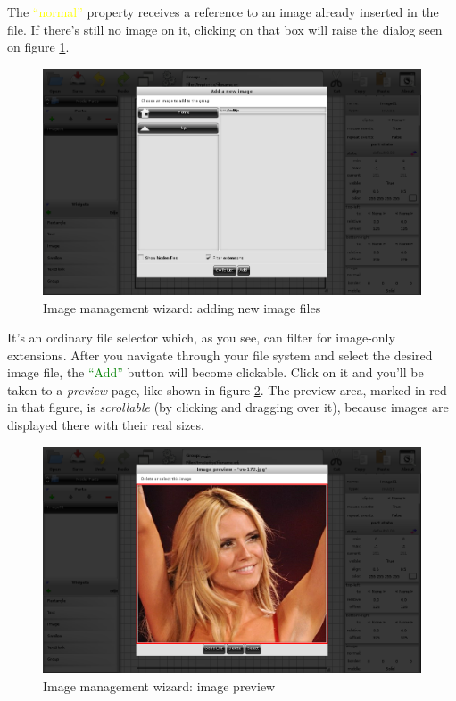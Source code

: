\documentclass[a4paper]{profusion}
\newcommand{\GUIButton}[1]{\textcolor{green}{#1}} %
\newcommand{\GUIEditable}[1]{\textcolor{yellow}{#1}} %
\begin{document}
The \GUIEditable{``normal''} property receives a reference to an image
already inserted in the file. If there's still no image on it,
clicking on that box will raise the dialog seen on figure
\ref{fig:new_img_dialog}.

\begin{figure}[h!]
  \centering
  \includegraphics[width=1.0\textwidth]{images/new_img_dialog.png}
  \caption{Image management wizard: adding new image files}
  \label{fig:new_img_dialog}
\end{figure}

It's an ordinary file selector which, as you see, can filter for
image-only extensions. After you navigate through your file system and
select the desired image file, the \GUIButton{``Add''} button will
become clickable. Click on it and you'll be taken to a \emph{preview}
page, like shown in figure \ref{fig:img_preview_dialog}. The preview
area, marked in red in that figure, is \emph{scrollable} (by clicking
and dragging over it), because images are displayed there with their
real sizes.

\begin{figure}[h!]
  \centering
  \includegraphics[width=1.0\textwidth]{images/img_preview_dialog.png}
  \caption{Image management wizard: image preview}
  \label{fig:img_preview_dialog}
\end{figure}
\end{document}
